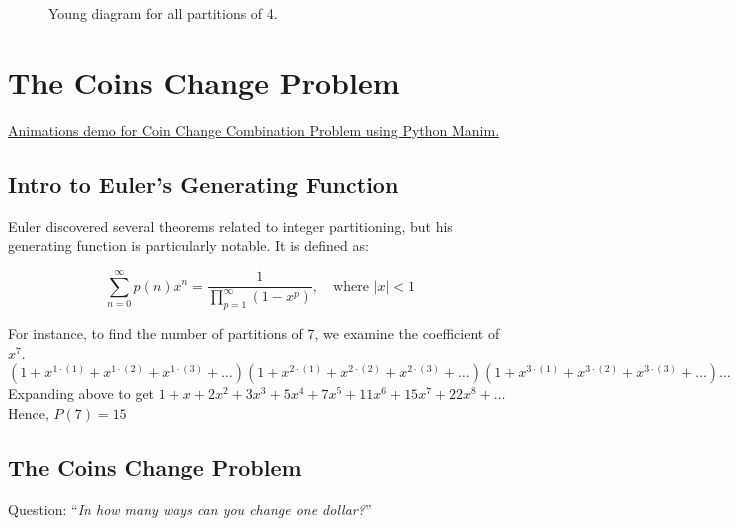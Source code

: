\documentclass{article}
\theoremstyle{definition}
\theoremstyle{question}
\begin{document}
\begin{figure}[h]
\centering
{}
\caption{Young diagram for all partitions of 4.}
\end{figure}


\newpage
\section{The Coins Change Problem}

\noindent \href{https://youtu.be/PmR1eRswj3A}{Animations demo for Coin Change Combination Problem using Python Manim.}\cite{manim}


\subsection{Intro to Euler's Generating Function}
Euler discovered several theorems related to integer partitioning, but his generating function is particularly notable. It is defined as:

\[
\sum_{n=0}^{\infty} p(n) x^n = \frac{1}{\prod_{p=1}^{\infty} (1-x^p)}, \quad \text{where } |x| < 1
\]

\noindent For instance, to find the number of partitions of 7, we examine the coefficient of \(x^7\).
\[
(1 + x^{1\cdot(1)} + x^{1\cdot(2)} + x^{1\cdot(3)} + \ldots )(1 + x^{2\cdot(1)} + x^{2\cdot(2)} + x^{2\cdot(3)} + \ldots )(1 + x^{3\cdot(1)} + x^{3\cdot(2)} + x^{3\cdot(3)} + \ldots ) \ldots
\]
Expanding above to get \(1 + x + 2x^2 + 3x^3 + 5x^4 + 7x^5 + 11x^6 + 15x^7 + 22x^8 + \ldots\)
\newline
\newline
\noindent Hence, \(P(7)=15\)


\subsection{The Coins Change Problem}
\begin{center}
    Question:
    “\textit{In how many ways can you change one dollar?}” \cite{gpolya1956}
\end{center}
\end{document}
